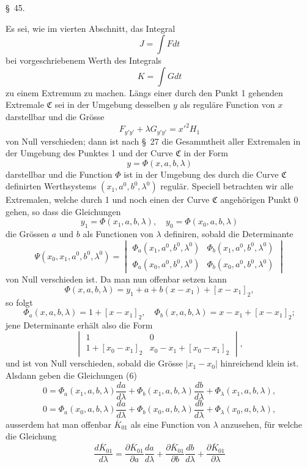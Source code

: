 \documentclass[11pt,a4paper,leqno]{article}
\begin{document}
\begin{center}
{\large \S~45.}
\end{center}

Es sei, wie im vierten Abschnitt, das Integral
\[
J=\int Fdt
\]
bei vorgeschriebenem Werth des Integrals
\[
K=\int Gdt
\]
zu einem Extremum zu machen. Längs einer durch den Punkt 1 gehenden Extremale $\mathfrak{C}$ sei in der Umgebung desselben $y$ als reguläre Function von $x$ darstellbar und die Grösse
\[
F_{y'y'}+\lambda G_{y'y'}=x'^2H_1
\]
von Null verschieden; dann ist nach \S~27 die Gesammtheit aller Extremalen in der Umgebung des Punktes 1 und der Curve $\mathfrak{C}$ in der Form
\[
y=\Phi(x,a,b,\lambda)
\]
darstellbar und die Function $\Phi$ ist in der Umgebung des durch die Curve $\mathfrak{C}$ definirten Werthsystems $(x_1,a^0,b^0,\lambda^0)$ regulär. Speciell betrachten wir alle Extremalen, welche durch 1 und noch einen der Curve $\mathfrak{C}$ angehörigen Punkt 0 gehen, so dass die Gleichungen
\begin{equation}\tag{6}
y_1=\Phi(x_1,a,b,\lambda),\quad y_0=\Phi(x_0,a,b,\lambda)
\end{equation}
die Grössen $a$ und $b$ als Functionen von $\lambda$ definiren, sobald die Determinante
\[
\Psi(x_0,x_1,a^0,b^0,\lambda^0)=
\begin{vmatrix}
\Phi_a(x_1,a^0,b^0,\lambda^0)&\Phi_b(x_1,a^0,b^0,\lambda^0)\\
\Phi_a(x_0,a^0,b^0,\lambda^0)&\Phi_b(x_0,a^0,b^0,\lambda^0)
\end{vmatrix}
\]
von Null verschieden ist. Da man nun offenbar setzen kann
\[
\Phi(x,a,b,\lambda)=y_1+a+b(x-x_1)+[x-x_1]_2,
\]
so folgt
\[
\Phi_a(x,a,b,\lambda)=1+[x-x_1]_2,
\quad
\Phi_b(x,a,b,\lambda)=x-x_1+[x-x_1]_2;
\]
jene Determinante erhält also die Form
\[
\begin{vmatrix}
1&0\\
1+[x_0-x_1]_2&x_0-x_1+[x_0-x_1]_2
\end{vmatrix},
\]
und ist von Null verschieden, sobald die Grösse $|x_1-x_0|$ hinreichend klein ist. Alsdann geben die Gleichungen (6)
\[
0=\Phi_a(x_1,a,b,\lambda)\frac{da}{d\lambda}
+\Phi_b(x_1,a,b,\lambda)\frac{db}{d\lambda}
+\Phi_\lambda(x_1,a,b,\lambda),
\]
\[
0=\Phi_a(x_0,a,b,\lambda)\frac{da}{d\lambda}
+\Phi_b(x_0,a,b,\lambda)\frac{db}{d\lambda}
+\Phi_\lambda(x_0,a,b,\lambda),
\]
ausserdem hat man offenbar $\overline{K}_{01}$ als eine Function von $\lambda$ anzusehen, für welche die Gleichung
\[
\frac{d\overline{K}_{01}}{d\lambda}
=\frac{\partial\overline{K}_{01}}{\partial a}\frac{da}{d\lambda}
+\frac{\partial\overline{K}_{01}}{\partial b}\frac{db}{d\lambda}
+\frac{\partial\overline{K}_{01}}{\partial\lambda}
\]
\end{document}
